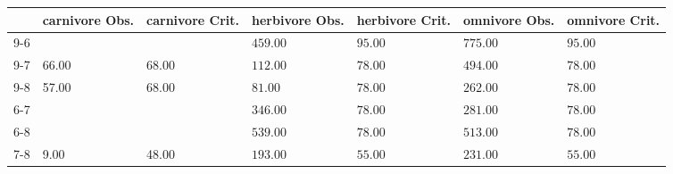 \begin{table}[ht]
\centering
\begin{tabular}{rllllll}
  \toprule
 & carnivore Obs. & carnivore Crit. & herbivore Obs. & herbivore Crit. & omnivore Obs. & omnivore Crit. \\ 
  \midrule
9-6 &  &  & \(\mathbf{459.00}\) & \(\mathbf{95.00}\) & \(\mathbf{775.00}\) & \(\mathbf{95.00}\) \\ 
  9-7 & 66.00 & 68.00 & \(\mathbf{112.00}\) & \(\mathbf{78.00}\) & \(\mathbf{494.00}\) & \(\mathbf{78.00}\) \\ 
  9-8 & 57.00 & 68.00 & \(\mathbf{81.00}\) & \(\mathbf{78.00}\) & \(\mathbf{262.00}\) & \(\mathbf{78.00}\) \\ 
  6-7 &  &  & \(\mathbf{346.00}\) & \(\mathbf{78.00}\) & \(\mathbf{281.00}\) & \(\mathbf{78.00}\) \\ 
  6-8 &  &  & \(\mathbf{539.00}\) & \(\mathbf{78.00}\) & \(\mathbf{513.00}\) & \(\mathbf{78.00}\) \\ 
  7-8 & 9.00 & 48.00 & \(\mathbf{193.00}\) & \(\mathbf{55.00}\) & \(\mathbf{231.00}\) & \(\mathbf{55.00}\) \\ 
   \bottomrule
\end{tabular}
\end{table}
